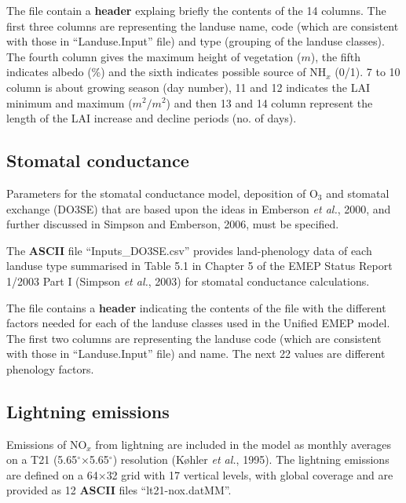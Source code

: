 The file contain a {\bf header} explaing briefly the contents of the 
14 columns. 
The first three columns are representing the landuse name, code (which
are consistent with those in ``Landuse.Input'' file) and
type (grouping of the landuse classes). The fourth column gives
the maximum height of vegetation ($m$), the fifth indicates albedo (\%) and
the sixth indicates possible source of NH$_{x}$ (0/1). 7 to 10
column is about growing season (day number), 11 and 12 indicates the
LAI minimum  and maximum ($m^{2}/m^{2}$) and then 13 and 14 column
represent the length of the LAI increase and decline periods (no. of days).


\subsection{Stomatal conductance}
Parameters for the stomatal conductance model, deposition of O$_{3}$ and
stomatal exchange (DO3SE) that are based upon the ideas in
Emberson {\sl et al.}, 2000, and further discussed in Simpson and Emberson,
2006, must be specified.  

The {\bf ASCII} file ``Inputs\_DO3SE.csv'' provides land-phenology data
of each landuse type summarised in Table 5.1 in Chapter 5 of the EMEP 
Status Report 1/2003 Part I (Simpson {\sl et al.}, 2003) for stomatal
conductance calculations.

The file contains a {\bf header} indicating the contents of the file
with the different factors needed for each of the landuse classes used
in the Unified EMEP model. The first two columns are representing the
landuse code (which are consistent with those in ``Landuse.Input'' file)
and name. The next 22 values are different phenology factors.

\subsection{Lightning emissions}
Emissions of NO$_{x}$ from lightning are included in the model
as monthly averages on a T21 (5.65$^{\circ}$$\times$5.65$^{\circ}$) resolution (K{\o}hler {\sl et al.}, 1995). 
The lightning emissions are defined on a 64$\times$32 grid with 17 vertical
levels, with global coverage and are provided as 12 {\bf ASCII} files
``lt21-nox.datMM''.


